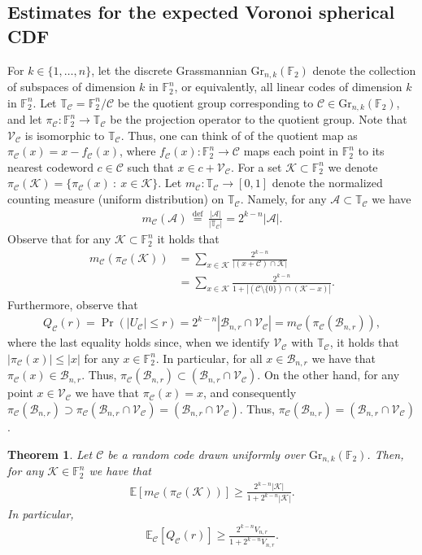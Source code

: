 \documentclass[article,doublecolumn]{IEEEtran}
\newcommand{\F}{{\mathbb{F}}}
\newcommand{\EE}{{\mathbb{E}}}
\newcommand{\df}{{\, \stackrel{\mathrm{def}}{=}\, }}
\newcommand{\TT}{{\mathbb{T}}}
\newcommand{\BB}{{\mathcal{B}}}
\newcommand{\CC}{{\mathcal{C}}}
\newcommand{\Gr}{{\mathrm{Gr}}}
\newcommand{\KK}{{\mathcal{K}}}
\newcommand{\VC}{\mathcal{V}_{\mathcal{C}}}
\newtheorem{thm}{Theorem}[section]
\begin{document}
\subsection{Estimates for the expected Voronoi spherical CDF}

For $k
\in \{1, \ldots, n\}$, let the discrete Grassmannian
$\Gr_{n,k}(\F_2)$ denote the collection of subspaces of
dimension $k$ in $\F_2^n$, or equivalently, all linear codes of dimension $k$ in $\F_2^n$. Let $\TT_{\CC}=\F_2^n/\CC$ be the quotient group corresponding to $\CC\in\Gr_{n,k}(\F_2)$, and let $\pi_{\CC}:\F_2^n\to\TT_{\CC}$ be the projection operator to the quotient group. Note that $\VC$ is isomorphic to $\TT_\CC$. 
Thus, one can think of of the quotient map as $\pi_\CC(x)=x-f_\CC(x)$, where $f_\CC(x):\F_2^n\to\CC$ maps each point in $\F_2^n$ to its nearest codeword $c\in\CC$ such that $x\in c+\VC$. For a set $\KK\subset\F_2^n$ we denote $\pi_\CC(\KK)=\{\pi_\CC(x)~:~x\in\KK\}$. Let $m_{\CC}:\TT_\CC\to[0,1]$ denote the normalized counting measure (uniform distribution) on $\TT_\CC$. Namely, for any $\mathcal{A}\subset\TT_\CC$ we have
\begin{align}
m_{\CC}(\mathcal{A})\df\frac{|\mathcal{A}|}{|\TT_{\CC}|}=2^{k-n}|\mathcal{A}|.
\end{align}
Observe that for any $\KK\subset\F_2^n$ it holds that
\begin{align}
m_{\CC}(\pi_{\CC}(\KK))&=\sum_{x\in\KK}\frac{2^{k-n}}{|(x+\CC)\cap \KK|}\\
&=\sum_{x\in\KK}\frac{2^{k-n}}{1+|(\CC\setminus\{0\})\cap (\KK-x)|}.
\label{eq:F2nprojectionvolume}
\end{align}
Furthermore, observe that
\begin{align}
Q_\CC(r)=\Pr(|U_\CC|\leq r)=2^{k-n} |\BB_{n,r}\cap \VC| =m_{\CC}(\pi_{\CC}(\BB_{n,r})),   
\label{eq:F2mCeqQC}
\end{align}
where the last equality holds since, when we identify $\VC$ with $\TT_\CC$, it holds that $|\pi_{\CC}(x)|\leq |x|$ for any $x\in\F_2^n$. In particular, for all $x\in\BB_{n,r}$ we have that $\pi_{\CC}(x)\in\BB_{n,r}$. Thus, $\pi_{\CC}(\BB_{n,r})\subset ( \BB_{n,r}\cap \VC)$. On the other hand, for any point $x\in\VC$ we have that $\pi_\CC(x)=x$, and consequently $\pi_{\CC}(\BB_{n,r})\supset\pi_{\CC}(\BB_{n,r}\cap \VC)=(\BB_{n,r}\cap \VC)$. Thus, $\pi_{\CC}(\BB_{n,r})=(\BB_{n,r}\cap \VC)$.

\begin{thm}
Let $\CC$ be a random code drawn uniformly over $\Gr_{n,k}(\F_2)$. Then, for any $\KK\in\F_2^n$ we have that
\begin{align}
\EE[m_{\CC}(\pi_{\CC}(\KK))]\geq \frac{2^{k-n}|\KK|}{1+2^{k-n}|\KK|} . 
\label{eq:F2projectionmeasurebound}
\end{align}
In particular,
\begin{align}
\EE_\CC[Q_\CC(r)]\geq \frac{2^{k-n}V_{n,r}}{1+2^{k-n}V_{n,r}}.\label{eq:mcballRC}
\end{align}
\label{thm:RCmc}
\end{thm}
\end{document}
